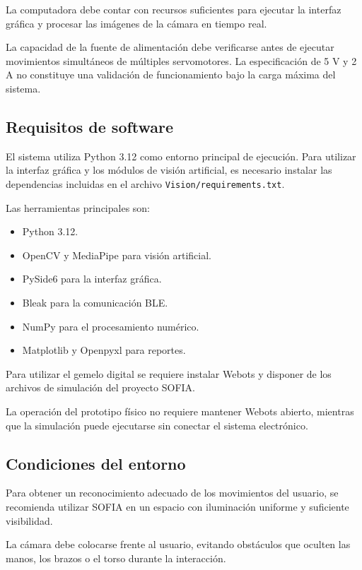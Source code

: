 \documentclass[letterpaper,journal]{IEEEtran}
\begin{document}
La computadora debe contar con recursos suficientes
para ejecutar la interfaz gráfica y procesar las
imágenes de la cámara en tiempo real.

La capacidad de la fuente de alimentación debe
verificarse antes de ejecutar movimientos simultáneos
de múltiples servomotores. La especificación de 5 V
y 2 A no constituye una validación de funcionamiento
bajo la carga máxima del sistema.

\subsection{Requisitos de software}

El sistema utiliza Python 3.12 como entorno principal
de ejecución. Para utilizar la interfaz gráfica y
los módulos de visión artificial, es necesario instalar
las dependencias incluidas en el archivo
\texttt{Vision/requirements.txt}.

Las herramientas principales son:

\begin{itemize}
    \item Python 3.12.
    \item OpenCV y MediaPipe para visión artificial.
    \item PySide6 para la interfaz gráfica.
    \item Bleak para la comunicación BLE.
    \item NumPy para el procesamiento numérico.
    \item Matplotlib y Openpyxl para reportes.
\end{itemize}

Para utilizar el gemelo digital se requiere instalar
Webots y disponer de los archivos de simulación del
proyecto SOFIA.

La operación del prototipo físico no requiere
mantener Webots abierto, mientras que la simulación
puede ejecutarse sin conectar el sistema electrónico.

\subsection{Condiciones del entorno}

Para obtener un reconocimiento adecuado de los
movimientos del usuario, se recomienda utilizar
SOFIA en un espacio con iluminación uniforme
y suficiente visibilidad.

La cámara debe colocarse frente al usuario,
evitando obstáculos que oculten las manos,
los brazos o el torso durante la interacción.
\end{document}
